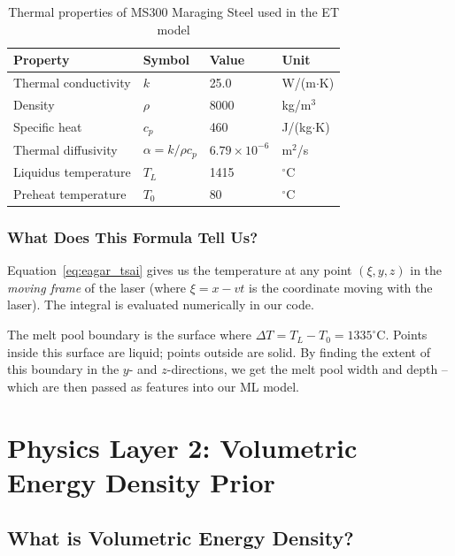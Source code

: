 \documentclass[12pt,a4paper]{report}
\begin{document}
\begin{table}[h!]
\centering
\caption{Thermal properties of MS300 Maraging Steel used in the ET model}
\begin{tabular}{@{}llll@{}}
\toprule
\textbf{Property} & \textbf{Symbol} & \textbf{Value} & \textbf{Unit} \\
\midrule
Thermal conductivity & $k$ & 25.0 & W/(m$\cdot$K) \\
Density & $\rho$ & 8000 & kg/m$^3$ \\
Specific heat & $c_p$ & 460 & J/(kg$\cdot$K) \\
Thermal diffusivity & $\alpha = k/\rho c_p$ & $6.79 \times 10^{-6}$ & m$^2$/s \\
Liquidus temperature & $T_L$ & 1415 & $^\circ$C \\
Preheat temperature & $T_0$ & 80 & $^\circ$C \\
\bottomrule
\end{tabular}
\end{table}

\subsection{What Does This Formula Tell Us?}

Equation~\eqref{eq:eagar_tsai} gives us the temperature at any point $(\xi, y, z)$ in the \textit{moving frame} of the laser (where $\xi = x - vt$ is the coordinate moving with the laser). The integral is evaluated numerically in our code.

The melt pool boundary is the surface where $\Delta T = T_L - T_0 = 1335^\circ$C. Points inside this surface are liquid; points outside are solid. By finding the extent of this boundary in the $y$- and $z$-directions, we get the melt pool width and depth -- which are then passed as features into our ML model.

\chapter{Physics Layer 2: Volumetric Energy Density Prior}

\section{What is Volumetric Energy Density?}
\end{document}
